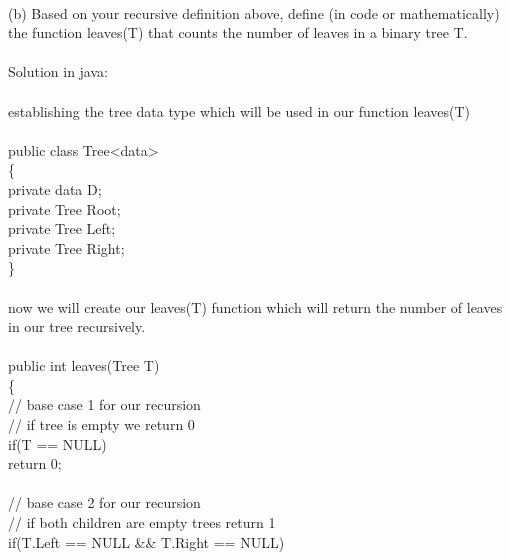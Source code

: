\documentclass{article}
\newcommand*\moveToRight[1]{\hspace*{0em plus 1fill}\makebox{(#1)}}
\newcommand*\fixindent{ \hspace{1pt}\\}
\begin{document}
\fixindent{}
(b) Based on your recursive definition above, define (in code or mathematically) the function leaves(T)
that counts the number of leaves in a binary tree T. \moveToRight{4 marks}\\\\Solution in java:\\
\\establishing the tree data type which will be used in our function leaves(T) \\\\
\hspace*{150pt}public class Tree\textless  data\textgreater\\
\hspace*{150pt}\{\\
\hspace*{165pt} private data D;\\
\hspace*{165pt} private Tree Root;\\
\hspace*{165pt} private Tree Left;\\
\hspace*{165pt} private Tree Right;\\
\hspace*{150pt}\}\\\\
now we will create our leaves(T) function which will return
the number of leaves in our tree recursively.\\\\
\hspace*{150pt}public int leaves(Tree T)\\
\hspace*{150pt}\{\\
\hspace*{165pt}// base case 1 for our recursion \\
\hspace*{165pt}// if tree is empty we return 0 \\
\hspace*{165pt} if(T == NULL)\\
\hspace*{180pt} return 0;\\\\
\hspace*{165pt}// base case 2 for our recursion \\
\hspace*{165pt}// if both children are empty trees return 1 \\
\hspace*{165pt} if(T.Left == NULL \&\& T.Right == NULL)\\
\end{document}
